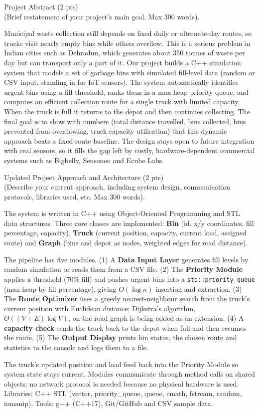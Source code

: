 \documentclass[10pt,a4paper]{article}
\newcommand{\sectionhead}[2]{%
  \needspace{8\baselineskip}
  \vspace{6pt}
  {\Large\color{headblue}#1}\\[-2pt]
  {\small\color{hintgrey}#2}\par\vspace{2pt}}
\begin{document}
\sectionhead{Project Abstract (2 pts)}{(Brief restatement of your project's main goal. Max 300 words).}
\begin{answerbox}
Municipal waste collection still depends on fixed daily or alternate-day routes, so trucks visit nearly empty bins while others overflow. This is a serious problem in Indian cities such as Dehradun, which generates about 350 tonnes of waste per day but can transport only a part of it. Our project builds a C++ simulation system that models a set of garbage bins with simulated fill-level data (random or CSV input, standing in for IoT sensors). The system automatically identifies urgent bins using a fill threshold, ranks them in a max-heap priority queue, and computes an efficient collection route for a single truck with limited capacity. When the truck is full it returns to the depot and then continues collecting. The final goal is to show with numbers (total distance travelled, bins collected, bins prevented from overflowing, truck capacity utilisation) that this dynamic approach beats a fixed-route baseline. The design stays open to future integration with real sensors, so it fills the gap left by costly, hardware-dependent commercial systems such as Bigbelly, Sensoneo and Ecube Labs.
\end{answerbox}

\sectionhead{Updated Project Approach and Architecture (2 pts)}{(Describe your current approach, including system design, communication protocols, libraries used, etc. Max 300 words).}
\begin{answerbox}
The system is written in C++ using Object-Oriented Programming and STL data structures. Three core classes are implemented: \textbf{Bin} (id, x/y coordinates, fill percentage, capacity), \textbf{Truck} (current position, capacity, current load, assigned route) and \textbf{Graph} (bins and depot as nodes, weighted edges for road distance).

The pipeline has five modules. (1) A \textbf{Data Input Layer} generates fill levels by random simulation or reads them from a CSV file. (2) The \textbf{Priority Module} applies a threshold (70\% fill) and pushes urgent bins into a \texttt{std::priority\_queue} (max-heap by fill percentage), giving $O(\log n)$ insertion and extraction. (3) The \textbf{Route Optimizer} uses a greedy nearest-neighbour search from the truck's current position with Euclidean distance; Dijkstra's algorithm, $O((V+E)\log V)$, on the road graph is being added as an extension. (4) A \textbf{capacity check} sends the truck back to the depot when full and then resumes the route. (5) The \textbf{Output Display} prints bin status, the chosen route and statistics to the console and logs them to a file.

The truck's updated position and load feed back into the Priority Module so system state stays current. Modules communicate through method calls on shared objects; no network protocol is needed because no physical hardware is used. Libraries: C++ STL (vector, priority\_queue, queue, cmath, fstream, random, iomanip). Tools: g++ (C++17), Git/GitHub and CSV sample data.
\end{answerbox}
\end{document}
